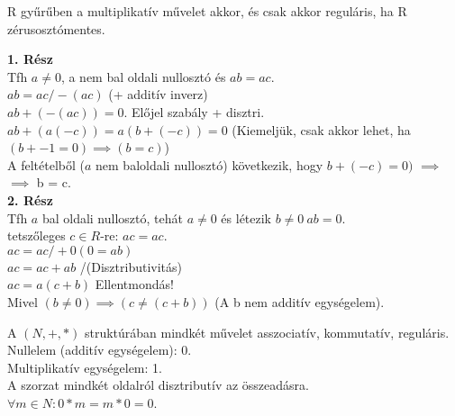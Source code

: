 \documentclass{beamer}
\begin{document}
\begin{frame}

\begin{tcolorbox}[title={Lemma: Nullosztó és regularitás}]
R gyűrűben a multiplikatív művelet akkor, és csak akkor reguláris, ha R zérusosztómentes.
\end{tcolorbox}

\begin{tcolorbox}[title={Bizonyítás}]
\textbf{1. Rész}\\
Tfh $a \neq 0$, a nem bal oldali nullosztó és $ab = ac$.\\
$ab = ac  / -(ac)$ (+ additív inverz)\\
$ab + (-(ac)) = 0$. Előjel szabály + disztri.\\
$ab + (a(-c)) = a(b+(-c)) = 0$ (Kiemeljük, csak akkor lehet, ha $(b + -1 = 0) \implies (b = c)$)\\
A feltételből ($a$ nem baloldali nullosztó) következik, hogy $b + (-c) = 0)$ $\implies$\\
$\implies$ b = c.\\
\bigskip
\textbf{2. Rész}\\
Tfh $a$ bal oldali nullosztó, tehát $a \neq 0$ és létezik $b \neq 0\: ab = 0$.\\
tetszőleges $c \in R$-re: $ac = ac$.\\
$ac = ac / +0 (0 = ab)$\\
$ac = ac + ab$ /(Disztributivitás)\\
$ac = a(c + b)$ Ellentmondás!\\
Mivel $(b \neq 0) \implies (c \neq (c + b))$ (A b nem additív egységelem).

\end{tcolorbox}

\end{frame}

\begin{frame}

\begin{tcolorbox}[title={Tétel: Természetes számok}]
A $(N, +, *)$ struktúrában mindkét művelet asszociatív, kommutatív, reguláris.\\
Nullelem (additív egységelem): 0.\\
Multiplikatív egységelem: 1.\\
A szorzat mindkét oldalról disztributív az összeadásra.\\
${\forall}m \in N : 0 * m = m * 0 = 0$.

\end{tcolorbox}

\end{frame}
\end{document}
